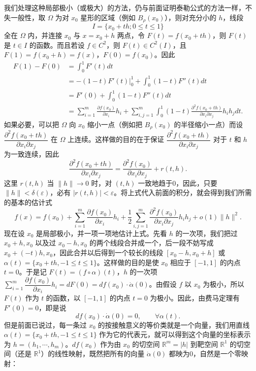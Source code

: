 我们处理这种局部极小（或极大）的方法，仍与前面证明泰勒公式的方法一样，不失一般性，取 $\Omega$ 为对 $x_0$ 星形的区域（例如 $B_\rho(x_0)$），则对充分小的 $h$，线段
\[
 I=\{x_0+th;0\le t\le1\}
\]
全在 $\Omega$ 内，并连接 $x_0$ 与 $x=x_0+h$ 两点，令 $F(t)=f(x_0+th)$，则 $F(t)$ 是 $t\in I$ 的函数。而且若设 $f\in C^2$，则 $F(t)\in C^2(I)$，且 $F(1)=f(x_0+h)=f(x)$，$F(0)=f(x_0)$。因此
\begin{align*}
 F(1)-F(0)&=\int_0^1F'(t)dt\\
 & =-(1-t)F'(t)\big|_0^1+\int_0^1(1-t)F''(t)dt\\
 &=F'(0)+\int_0^1(1-t)F''(t)dt\\
 &=\sum_{i=1}^m\frac{\partial f(x_0)}{\partial x_i}h_i
 +\sum_{i,j=1}^m\int_0^1(1-t)\frac{\partial^2f(x_0+th)}{\partial x_i\partial x_j}h_i h_jdt.
\end{align*}
如果必要，可以把 $\Omega$ 向 $x_0$ 缩小一点（例如把 $B_\rho(x_0)$ 的半径缩小一点）而设 $\dfrac{\partial^2f(x_0+th)}{\partial x_i\partial x_j}$ 在 $\Omega$ 上连续。这样做的目的在于保证 $\dfrac{\partial^2f(x_0+th)}{\partial x_i\partial x_j}$ 对于 $t$ 和 $h$ 为一致连续，因此
\[
 \frac{\partial^2f(x_0+th)}{\partial x_i\partial x_j}
 =\frac{\partial^2f(x_0)}{\partial x_i\partial x_j}+r(t,h).
\]
这里 $r(t,h)$ 当 $\lVert h\rVert\to0$ 时，对 $(t,h)$ 一致地趋于0，因此，只要 $\lVert h\rVert<\delta(\varepsilon)$，必有 $|r(t,h)|<\varepsilon$。将上式代入前面的积分，就会得到我们所需的基本的估计式
\begin{equation}
 f(x)=f(x_0)+\sum_{i=1}^m\frac{\partial f(x_0)}{\partial x_i}h_i
 +\frac12\sum_{i,j=1}^m\frac{\partial^2f(x_0)}{\partial x_i\partial x_j}h_i h_j+o(1)\lVert h\rVert^2.
 \tag{15}
\end{equation}
现在设 $x_0$ 是局部极小，并一项一项地估计上式。先看 $h$ 的一次项，我们把过 $x_0+h,x_0$ 以及过 $x_0-h,x_0$ 的两个线段合并成一个，后一段不妨写成 $x_0+(-t)h,x_0$，因此合并以后得到一个较长的线段 $[x_0-h,x_0+h]$ 或 $\alpha(t)=\{x_0+th,-1\le t\le1\}$。这样做的目的是使 $x_0$ 相应于 $[-1,1]$ 的内点 $t=0$。于是记 $F(t)=(f\circ\alpha)(t)$，$h$ 的一次项 $\sum_{i=1}^m\dfrac{\partial f(x_0)}{\partial x_i}h_i=dF(0)=df(x_0)\cdot\dot\alpha(0)$。由假设 $f$ 以 $x_0$ 为极小，所以 $F(t)$ 作为 $t$ 的函数，以 $[-1,1]$ 的内点 $t=0$ 为极小。因此，由费马定理有 $F'(0)=0$，即是说
\[
 df(x_0)\cdot\dot\alpha(0)=0,\qquad \forall\alpha(t).
\]
但是前面已说过，每一条过 $x_0$ 的按接触意义的等价类就是一个向量，我们用直线 $\alpha(t)=\{x_0+th,-1\le t\le1\}$ 作为它的代表元，就可以得到这个向量的坐标表示为 $h=(h_1,\cdots,h_m)$。$df(x_0)$ 作为由 $x_0$ 的切空间 $\mathbb R^m=|h|$ 到靶空间 $\mathbb R^1$ 的切空间（还是 $\mathbb R^1$）的线性映射，既然把所有的向量 $\dot\alpha(0)$ 都映为0，自然是一个零映射：
